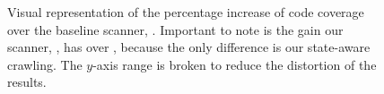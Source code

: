 \begin{figure}[tb]
  \centering
  \resizebox{\textwidth}{!}{\fontsize{10pt}{10pt}\selectfont}
  \caption{Visual representation of the percentage increase of code
    coverage over the baseline scanner, \wget{}. Important to note is
    the gain our scanner, \crawler{}, has over \waf{}, because the
    only difference is our state-aware crawling. The $y$-axis range is
    broken to reduce the distortion of the \wackopicko{} results. }
\end{figure}
